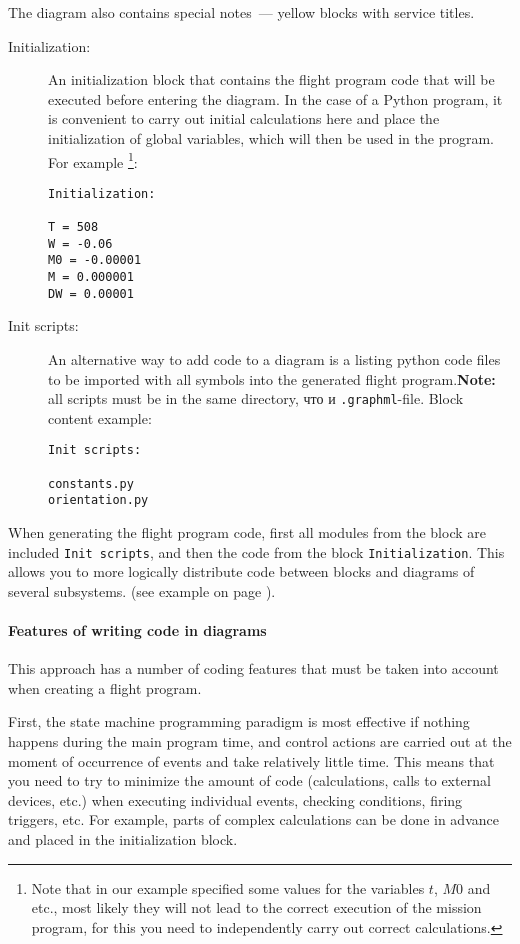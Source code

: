 \documentclass[12pt,a4paper]{article}
\begin{document}
The diagram also contains special notes~--- yellow blocks with service titles.
\begin{description}
\item[Initialization:] An initialization block that contains the flight program code that will be executed before entering the diagram. In the case of a Python program, it is convenient to carry out initial calculations here and place the initialization of global variables, which will then be used in the program. For example \footnote{Note that in our example specified some values for the variables $t$, $M0$ and etc., most likely they will not lead to the correct execution of the mission program, for this you need to independently carry out correct calculations.}:

\begin{verbatim}
Initialization:

T = 508
W = -0.06
M0 = -0.00001
M = 0.000001
DW = 0.00001
\end{verbatim}

\item[Init scripts:] An alternative way to add code to a diagram is a listing python code files to be imported with all symbols into the generated flight program.\textbf{Note:} all scripts must be in the same directory,
  что и \verb'.graphml'-file. Block content example:

\begin{verbatim}
Init scripts:

constants.py
orientation.py
\end{verbatim}

\end{description}

When generating the flight program code, first all modules from the block are included
\verb'Init scripts', and then the code from the block \verb'Initialization'. This allows you to more logically distribute code between blocks and diagrams of several subsystems. (see example on page \pageref{MULTIPLE_MODULES}).

\paragraph{Features of writing code in diagrams} This approach has a number of coding features that must be taken into account when creating a flight program.

First, the state machine programming paradigm is most effective if nothing happens during the main program time, and control actions are carried out at the moment of occurrence of events and take relatively little time. This means that you need to try to minimize the amount of code (calculations, calls to external devices, etc.) when executing individual events, checking conditions, firing triggers, etc. For example, parts of complex calculations can be done in advance and placed in the initialization block.
\end{document}
